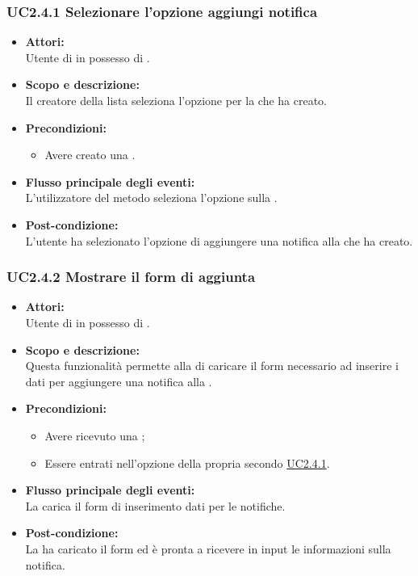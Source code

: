 \subsubsection{UC2.4.1 Selezionare l'opzione aggiungi notifica} \label{UC2.4.1}

\begin{itemize}
	\item \textbf{Attori:}
	\\Utente di  in possesso di \ProjectName{}.
	\item \textbf{Scopo e descrizione:} 
	\\Il creatore della lista seleziona l'opzione  per la  che ha creato.
	\item \textbf{Precondizioni:}
	\begin{itemize}
		\item Avere creato una  .
	\end{itemize}
	\item \textbf{Flusso principale degli eventi:}
	\\L'utilizzatore del metodo seleziona l'opzione  sulla .
	\item \textbf{Post-condizione:}
	\\L'utente ha selezionato l'opzione di aggiungere una notifica alla  che ha creato.
\end{itemize}

\subsubsection{UC2.4.2 Mostrare il form di aggiunta} \label{UC2.4.2}

\begin{itemize}
	\item \textbf{Attori:}
	\\Utente di  in possesso di \ProjectName{}.
	\item \textbf{Scopo e descrizione:} 
	\\Questa funzionalità permette alla  di caricare il form necessario ad inserire i dati per aggiungere una notifica alla .
	\item \textbf{Precondizioni:}
	\begin{itemize}
		\item Avere ricevuto una  ;
		\item Essere entrati nell'opzione  della propria  secondo \hyperref[UC2.4.1]{UC2.4.1}.
	\end{itemize}
	\item \textbf{Flusso principale degli eventi:}
	\\La {}  carica il form di inserimento dati per le notifiche.
	\item \textbf{Post-condizione:}
	\\La {} ha caricato il form ed è pronta a ricevere in input le informazioni sulla notifica.
\end{itemize}

